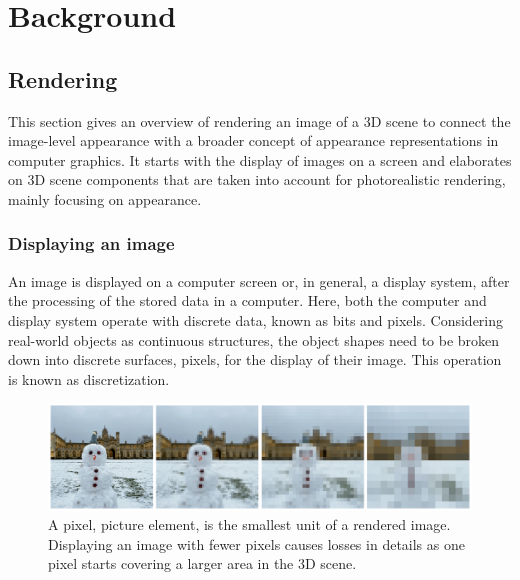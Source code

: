 \chapter{Background}

\section{Rendering}

This section gives an overview of rendering an image of a 3D scene to connect the image-level appearance with a broader concept of appearance representations in computer graphics.  It starts with the display of images on a screen and elaborates on 3D scene components that are taken into account for photorealistic rendering, mainly focusing on appearance. 

\subsection{Displaying an image}
An image is displayed on a computer screen or, in general, a display system, after the processing of the stored data in a computer. Here, both the computer and display system operate with discrete data, known as bits and pixels. Considering real-world objects as continuous structures, the object shapes need to be broken down into discrete surfaces, pixels, for the display of their image. This operation is known as discretization. 

\begin{figure}[h]
  \centering

    \includegraphics[width=\linewidth]{Images/pixelate_image_snowman.png}

   \caption{A pixel, picture element, is the smallest unit of a rendered image. Displaying an image with fewer pixels causes losses in details as one pixel starts covering a larger area in the 3D scene.}
   \label{fig:color-approximate}
\end{figure}

